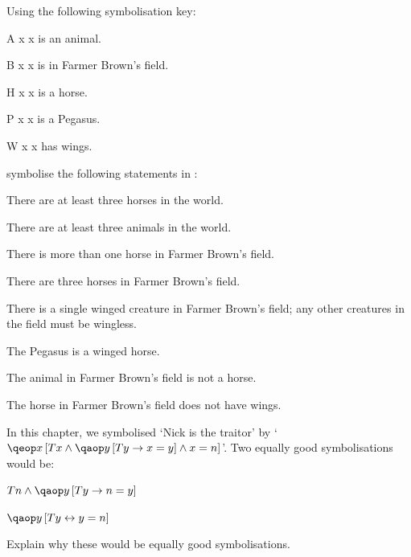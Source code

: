 \documentclass[PHIL101-Textbook.tex]{subfiles}
\begin{document}
\noindent
\problempart Using the following symbolisation key:
\begin{ekey}
\item[\atom A x ] x is an animal.
\item[\atom B x ] x is in Farmer Brown's field.
\item[\atom H x ] x is a horse.
\item[\atom P x ] x is a Pegasus.
\item[\atom W x ] x has wings.
\end{ekey}
symbolise the following statements in \pl:
\begin{earg}
\item There are at least three horses in the world.
\item There are at least three animals in the world.
\item There is more than one horse in Farmer Brown's field.
\item There are three horses in Farmer Brown's field.
\item There is a single winged creature in Farmer Brown's field; any other creatures in the field must be wingless.
\item The Pegasus is a winged horse.
\item The animal in Farmer Brown's field is not a horse.
\item The horse in Farmer Brown's field does not have wings.
\end{earg}

\noindent
\problempart
In this chapter, we symbolised `Nick is the traitor' by `$\qeb{x}{\atom T x \eand \qab{y}{\atom T y \eif x=y} \eand x = n}$'. Two equally good symbolisations would be:
	\begin{ebullet}
		\item $\atom T n \eand \qab{y}{\atom T y \eif n = y}$
		\item $\qab{y}{\atom T y \eiff y = n}$
	\end{ebullet}
Explain why these would be equally good symbolisations.
\end{document}
